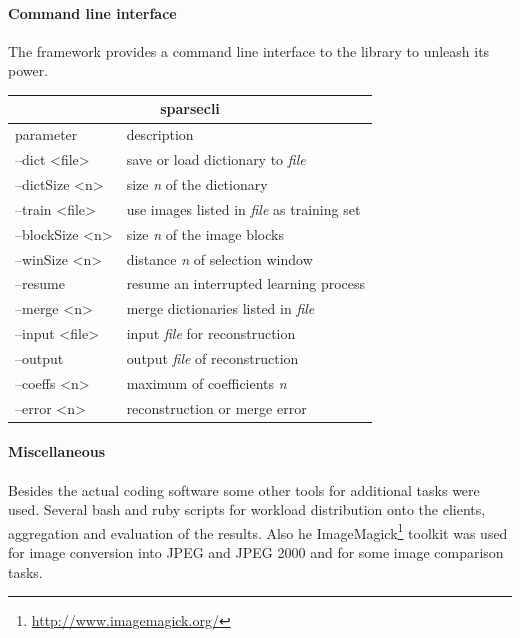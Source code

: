 \paragraph{Command line interface}
The framework provides a command line interface to the library to unleash its
power.
%
\begin{table}[H]
\centering
\begin{tabular}{ |l | l |}
\hline
\multicolumn{2}{|c|}{sparsecli}\\
\hline
parameter & description \\
\hline
--dict <file> & save or load dictionary to \emph{file}\\
--dictSize <n> & size \emph{n} of the dictionary  \\
--train <file> & use images listed in \emph{file} as training set\\
--blockSize <n> & size \emph{n} of the image blocks \\
--winSize <n> & distance \emph{n} of selection window \\
--resume & resume an interrupted learning process \\
--merge <n> & merge dictionaries listed in \emph{file}  \\
--input <file> & input \emph{file} for reconstruction \\
--output & output \emph{file} of reconstruction \\ 
--coeffs <n> & maximum of coefficients \emph{n} \\
--error <n> & reconstruction or merge error \\

\hline
\end{tabular}
\end{table}

\paragraph{Miscellaneous}
Besides the actual coding software some other tools for
additional tasks were used. Several bash and ruby scripts for workload
distribution onto the clients, aggregation and evaluation of the results.
Also he ImageMagick\footnote{\url{http://www.imagemagick.org/}} toolkit was used
for image conversion into JPEG and JPEG 2000 and for some image comparison
tasks.


